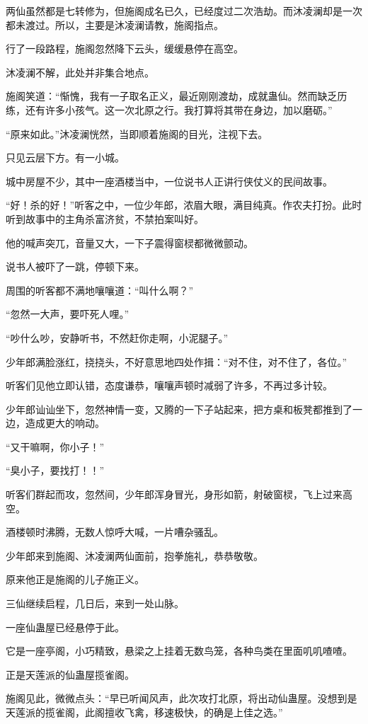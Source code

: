 \begin{this_body}
两仙虽然都是七转修为，但施阁成名已久，已经度过二次浩劫。而沐凌澜却是一次都未渡过。所以，主要是沐凌澜请教，施阁指点。

行了一段路程，施阁忽然降下云头，缓缓悬停在高空。

沐凌澜不解，此处并非集合地点。

施阁笑道：“惭愧，我有一子取名正义，最近刚刚渡劫，成就蛊仙。然而缺乏历练，还有许多小孩气。这一次北原之行。我打算将其带在身边，加以磨砺。”

“原来如此。”沐凌澜恍然，当即顺着施阁的目光，注视下去。

只见云层下方。有一小城。

城中房屋不少，其中一座酒楼当中，一位说书人正讲行侠仗义的民间故事。

“好！杀的好！”听客之中，一位少年郎，浓眉大眼，满目纯真。作农夫打扮。此时听到故事中的主角杀富济贫，不禁拍案叫好。

他的喊声突兀，音量又大，一下子震得窗棂都微微颤动。

说书人被吓了一跳，停顿下来。

周围的听客都不满地嚷嚷道：“叫什么啊？”

“忽然一大声，要吓死人哩。”

“吵什么吵，安静听书，不然赶你走啊，小泥腿子。”

少年郎满脸涨红，挠挠头，不好意思地四处作揖：“对不住，对不住了，各位。”

听客们见他立即认错，态度谦恭，嚷嚷声顿时减弱了许多，不再过多计较。

少年郎讪讪坐下，忽然神情一变，又腾的一下子站起来，把方桌和板凳都推到了一边，造成更大的响动。

“又干嘛啊，你小子！”

“臭小子，要找打！！”

听客们群起而攻，忽然间，少年郎浑身冒光，身形如箭，射破窗棂，飞上过来高空。

酒楼顿时沸腾，无数人惊呼大喊，一片嘈杂骚乱。

少年郎来到施阁、沐凌澜两仙面前，抱拳施礼，恭恭敬敬。

原来他正是施阁的儿子施正义。

三仙继续启程，几日后，来到一处山脉。

一座仙蛊屋已经悬停于此。

它是一座亭阁，小巧精致，悬梁之上挂着无数鸟笼，各种鸟类在里面叽叽喳喳。

正是天莲派的仙蛊屋揽雀阁。

施阁见此，微微点头：“早已听闻风声，此次攻打北原，将出动仙蛊屋。没想到是天莲派的揽雀阁，此阁擅收飞禽，移速极快，的确是上佳之选。”


\end{this_body}
